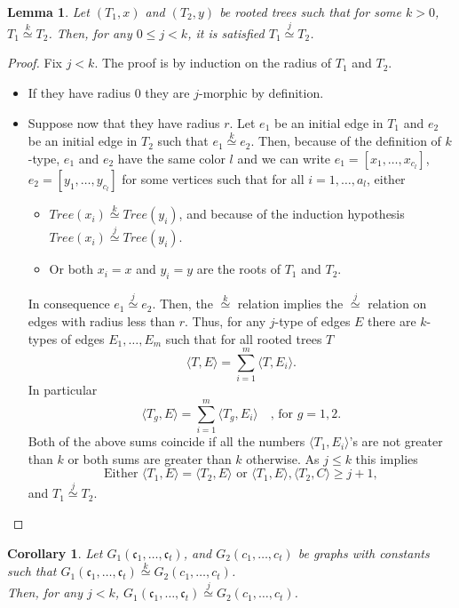 \documentclass[11pt,notitlepage,a4paper]{article}
\newtheorem{lemma}{Lemma}[section]
\newtheorem{corollary}{Corollary}[section]
\theoremstyle{definition}
\newcommand{\cc}{\mathfrak{c}}
\newcommand{\morph}[1]{\stackrel{#1}{\simeq}}
\begin{document}
\begin{lemma} \label{lem:lessktree}
	Let $(T_1,x)$ and $(T_2,y)$ be rooted trees such that for some $k>0$, 
	$T_1 \morph{k} T_2$. Then, for any $0\leq j < k$, it is satisfied
	$T_1 \morph{j} T_2$.
\end{lemma}
\begin{proof}
	Fix $j<k$. The proof is by induction on the radius of $T_1$ and $T_2$.
	\begin{itemize}[leftmargin=*]
		\item If they have radius $0$ they are $j$-morphic by definition. 
		\item Suppose now that they have radius $r$. Let $e_1$ be an initial edge 
		in $T_1$ and $e_2$ be an initial edge in $T_2$ such that $e_1 \morph{k} e_2$.
		Then, because of the definition of $k$-type,
		$e_1$ and $e_2$ have the same color $l$ and we can write
		$e_1=[x_1,\dots,x_{c_l}]$,
		$e_2=[y_1,\dots,y_{c_l}]$ for some vertices such that for all
		$i=1,\dots, a_l$, either 
		\begin{itemize}
			\item $Tree(x_i)\morph{k} Tree(y_i)$, and because of the induction hypothesis $Tree(x_i)\morph{j} Tree(y_i)$. 
			\item Or both $x_i=x$ and $y_i=y$ are the roots of $T_1$ and $T_2$.
		\end{itemize}
		In consequence $e_1\morph{j} e_2$. Then, the $\morph{k}$ relation
		implies the $\morph{j}$ relation on edges with radius less than $r$.
		Thus, for any $j$-type of edges $E$ there are 
		$k$-types of edges $E_1, \dots, E_m$ such that for all rooted trees $T$
		\[ \langle T,E\rangle = \sum_{i=1}^{m} \langle T,E_i \rangle .\]
		In particular
		\[\langle T_g , E\rangle =\sum_{i=1}^m \langle T_g, E_i \rangle 
		\quad \text{, for } 	g=1,2.\]	
	 	Both of the above sums coincide if all the numbers
	 	$\langle T_1, E_i\rangle$'s are not greater than $k$ or
	 	both sums are greater than $k$ otherwise. As $j\leq k$ this implies
	 	\[\text{Either }\langle T_1, E \rangle =\langle T_2,E \rangle \text{ or } \langle T_1,E \rangle ,\langle T_2,C \rangle \geq j+1 ,\]
	 	and $T_1\morph{j}T_2$. 		
	\end{itemize}
\end{proof}	


\begin{corollary}
	Let $G_1(\cc_1,\dots, \cc_t)$, and $G_2(c_1,\dots,c_t)$ be graphs
	with constants such that $G_1(\cc_1,\dots, \cc_t)\morph{k}G_2(c_1,\dots,c_t)$.
	\\
	Then, for any $j<k$, $G_1(\cc_1,\dots, \cc_t)\morph{j}G_2(c_1,\dots,c_t)$.
\end{corollary}
\end{document}
